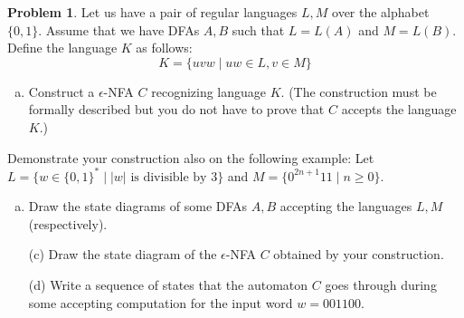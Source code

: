 \documentclass[a4paper,12pt]{article}
\theoremstyle{definition}
\newtheorem{problem}{Problem}
\begin{document}
\begin{problem}
    Let us have a pair of regular languages $L,M$ over the alphabet $\{0,1\}$. Assume that we have DFAs $A,B$ such that $L=L(A)$ and $M=L(B)$. Define the language $K$ as follows:
	$$K=\{uvw\mid uw\in L, v\in M\}$$

    \begin{enumerate}[(a)]	
		\item Construct a $\epsilon$-NFA $C$ recognizing language $K$. 
		(The construction must be formally described but you do not have to prove that $C$ accepts the language $K$.)
	\end{enumerate}
	Demonstrate your construction also on the following example: Let $L=\{w\in\{0,1\}^*\mid |w|\text{ is divisible by 3}\}$ and $M=\{0^{2n+1}11\mid n\geq 0\}$.
	
	\smallskip
	\begin{enumerate}[(b)]
		\item Draw the state diagrams of some DFAs $A,B$ accepting the languages $L,M$ (respectively). 
		\item[(c)] Draw the state diagram of the $\epsilon$-NFA $C$ obtained by your construction.
		\item[(d)] Write a sequence of states that the automaton $C$ goes through during some accepting computation for the input word $w=001100$.
	\end{enumerate}    
  
\end{problem}




\end{document}

